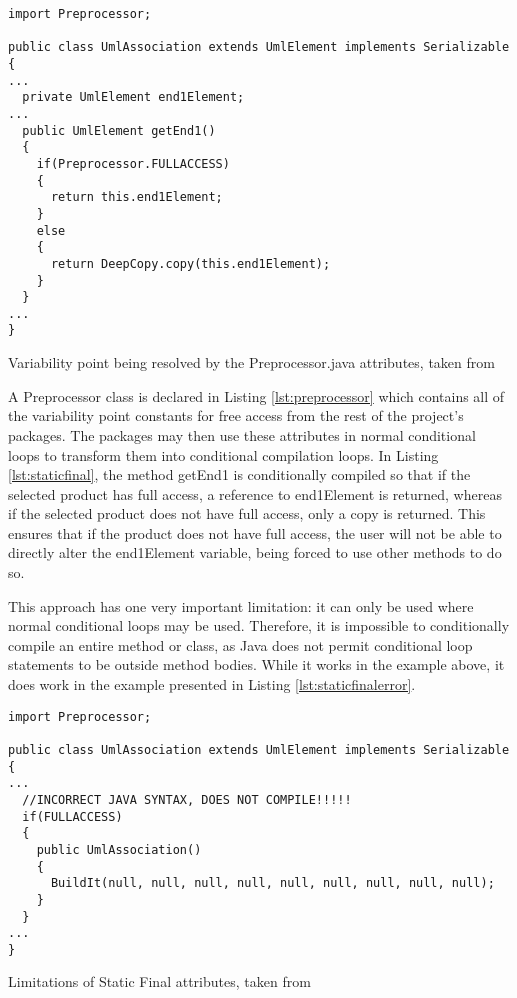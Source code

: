 \begin{listing}
\begin{verbatim}
import Preprocessor;

public class UmlAssociation extends UmlElement implements Serializable
{
...
  private UmlElement end1Element;
...
  public UmlElement getEnd1()
  {
    if(Preprocessor.FULLACCESS)
    {
      return this.end1Element;
    }
    else
    {
      return DeepCopy.copy(this.end1Element);
    }
  }
...
}
\end{verbatim}
\caption{Variability point being resolved by the Preprocessor.java attributes, taken from \cite{AUTOREST}} \label{lst:staticfinal}
\end{listing}

A Preprocessor class is declared in Listing \ref{lst:preprocessor} which contains all of the variability point constants for free access from the rest of the project's packages. The packages may then use these attributes in normal conditional loops to transform them into conditional compilation loops. In Listing \ref{lst:staticfinal}, the method getEnd1 is conditionally compiled so that if the selected product has full access, a reference to end1Element is returned, whereas if the selected product does not have full access, only a copy is returned. This ensures that if the product does not have full access, the user will not be able to directly alter the end1Element variable, being forced to use other methods to do so.

This approach has one very important limitation: it can only be used where normal conditional loops may be used. Therefore, it is impossible to conditionally compile an entire method or class, as Java does not permit conditional loop statements to be outside method bodies. While it works in the example above, it does work in the example presented in Listing \ref{lst:staticfinalerror}.

\begin{listing}
\begin{verbatim}
import Preprocessor;

public class UmlAssociation extends UmlElement implements Serializable
{
...
  //INCORRECT JAVA SYNTAX, DOES NOT COMPILE!!!!!
  if(FULLACCESS)
  {
    public UmlAssociation()
    {
      BuildIt(null, null, null, null, null, null, null, null, null);
    }
  }
...
}
\end{verbatim}
\caption{Limitations of Static Final attributes, taken from \cite{AUTOREST}} \label{lst:staticfinalerror}
\end{listing}

